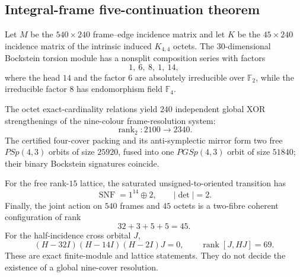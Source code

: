 \subsection{Integral-frame five-continuation theorem}
Let $M$ be the $540\times240$ frame--edge incidence matrix and let $K$ be the
$45\times240$ incidence matrix of the intrinsic induced $K_{4,4}$ octets.
The $30$-dimensional Bockstein torsion module has a nonsplit composition series
with factors
\[
  1,\ 6,\ 8,\ 1,\ 14,
\]
where the head $14$ and the factor $6$ are absolutely irreducible over
$\mathbb F_2$, while the irreducible factor $8$ has endomorphism field
$\mathbb F_4$.

The octet exact-cardinality relations yield $240$ independent global XOR
strengthenings of the nine-colour frame-resolution system:
\[
  \operatorname{rank}_{2}:2100\longrightarrow2340.
\]
The certified four-cover packing and its anti-symplectic mirror form two free
$PSp(4,3)$ orbits of size $25920$, fused into one $PGSp(4,3)$ orbit of size
$51840$; their binary Bockstein signatures coincide.

For the free rank-$15$ lattice, the saturated unsigned-to-oriented transition
has
\[
  \operatorname{SNF}=1^{14}\oplus2,
  \qquad |\det|=2.
\]
Finally, the joint action on $540$ frames and $45$ octets is a two-fibre
coherent configuration of rank
\[
  32+3+5+5=45.
\]
For the half-incidence cross orbital $J$,
\[
  (H-32I)(H-14I)(H-2I)J=0,
  \qquad \operatorname{rank}[J,HJ]=69.
\]
These are exact finite-module and lattice statements. They do not decide the
existence of a global nine-cover resolution.
